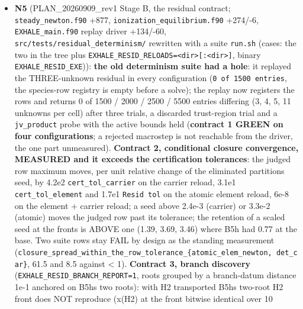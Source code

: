 \documentclass[english,a4paper]{my_memo}
\begin{document}
\begin{itemize}
  \textbf{Reported, not fixed}: the ray test runs before the acceptance test, so
  a catastrophic over-prediction (ratio -533, -1493 at iterations 47, 50) is
  named a slope disagreement; \texttt{ray\_h\ =\ 1e-3} is not a measured interval;
  \texttt{tr\_dmax} doubles without an absolute cap and with P2 runs to 2.7e8
  (harmless, the interior point is taken, but \texttt{delta} stops being a
  diagnostic); \texttt{n\_tr\_exit} has no index guard.
\item
  \textbf{N5} (PLAN\_20260909\_rev1 Stage B, the residual contract;
  \texttt{steady\_newton.f90} +877, \texttt{ionization\_equilibrium.f90} +274/-6,
  \texttt{EXHALE\_main.f90} replay driver +134/-60, \texttt{src/tests/residual\_determinism/}
  rewritten with a suite \texttt{run.sh} (cases: the two in the tree plus
  \texttt{EXHALE\_RESID\_RELOADS=\textless{}dir\textgreater{}{[}:\textless{}dir\textgreater{}{]}}, binary \texttt{EXHALE\_RESID\_EXE})): \textbf{the old
  determinism suite had a hole}: it replayed the THREE-unknown residual in
  every configuration (\texttt{0\ of\ 1500\ entries}, the species-row registry is
  empty before a solve); the replay now registers the rows and returns 0 of
  1500 / 2000 / 2500 / 5500 entries differing (3, 4, 5, 11 unknowns per
  cell) after three trials, a discarded trust-region trial and a \texttt{jv\_product}
  probe with the active bounds held (\textbf{contract 1 GREEN on four
  configurations}; a rejected macrostep is not reachable from the driver,
  the one part unmeasured). \textbf{Contract 2, conditional closure convergence,
  MEASURED and it exceeds the certification tolerances}: the judged row
  maximum moves, per unit relative change of the eliminated partition\textquotesingle s
  seed, by 4.2e2 \texttt{cert\_tol\_carrier} on the carrier reload, 3.1e1
  \texttt{cert\_tol\_element} and 1.7e1 \texttt{Resid\ tol} on the atomic element reload,
  6e-8 on the element + carrier reload; a seed above 2.4e-3 (carrier) or
  3.3e-2 (atomic) moves the judged row past its tolerance; the retention of
  a scaled seed at the fronts is ABOVE one (1.39, 3.69, 3.46) where B5h had
  0.77 at the base. Two suite rows stay FAIL by design as the standing
  measurement (\texttt{closure\_spread\_within\_the\_row\_tolerance\_\{atomic\_elem\_newton,\ det\_car\}}, 61.5 and 8.5 against \textless{} 1). \textbf{Contract 3, branch discovery}
  (\texttt{EXHALE\_RESID\_BRANCH\_REPORT=1}, roots grouped by a branch-datum distance
  1e-1 anchored on B5h\textquotesingle s two roots): with H2 transported B5h\textquotesingle s two-root H2
  front does NOT reproduce (x(H2) at the front bitwise identical over 10

\end{itemize}
\end{document}
